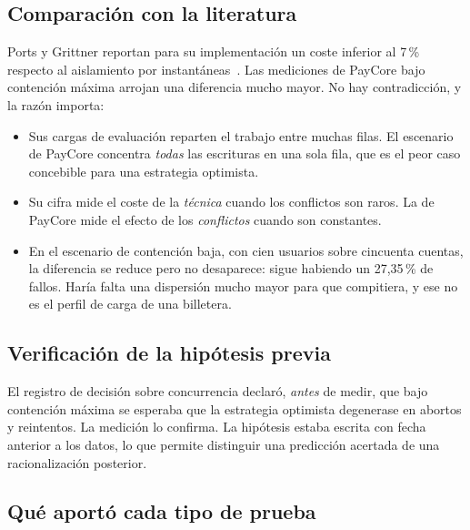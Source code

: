 \subsection{Comparación con la literatura}

Ports y Grittner reportan para su implementación un coste inferior al 7\,\%
respecto al aislamiento por instantáneas~\cite{ports2012}. Las mediciones de
PayCore bajo contención máxima arrojan una diferencia mucho mayor. No hay
contradicción, y la razón importa:

\begin{itemize}[leftmargin=1.2em]
  \item Sus cargas de evaluación reparten el trabajo entre muchas filas. El
    escenario  de PayCore concentra \emph{todas} las
    escrituras en una sola fila, que es el peor caso concebible para una
    estrategia optimista.
  \item Su cifra mide el coste de la \emph{técnica} cuando los conflictos son
    raros. La de PayCore mide el efecto de los \emph{conflictos} cuando son
    constantes.
  \item En el escenario de contención baja, con cien usuarios sobre cincuenta
    cuentas, la diferencia se reduce pero no desaparece: sigue habiendo un
    27,35\,\% de fallos. Haría falta una dispersión mucho mayor para que
     compitiera, y ese no es el perfil de carga de una
    billetera.
\end{itemize}

\subsection{Verificación de la hipótesis previa}

El registro de decisión sobre concurrencia declaró, \emph{antes} de medir, que
bajo contención máxima se esperaba que la estrategia optimista degenerase en
abortos y reintentos. La medición lo confirma. La hipótesis estaba escrita con
fecha anterior a los datos, lo que permite distinguir una predicción acertada
de una racionalización posterior.

\subsection{Qué aportó cada tipo de prueba}

